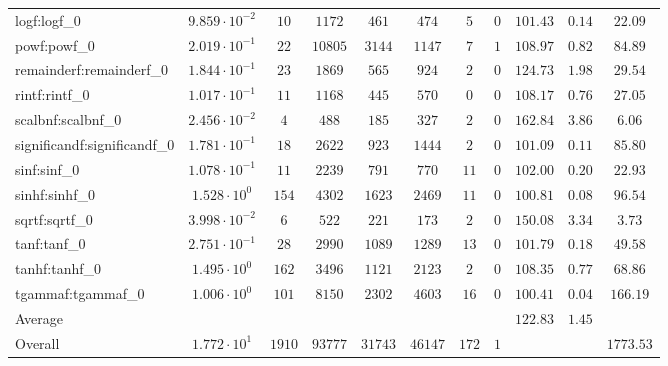 \begin{tabular}{|l|c|c|c|c|c|c|c|c|c|c|}
logf:logf\_0                 & $ 9.859 \cdot 10^{-2} $ & $ 10     $ & $ 1172  $ & $ 461   $ & $ 474   $ & $ 5   $ & $ 0 $ & $ 101.43      $ & $ 0.14    $ & $ 22.09   $ \\
powf:powf\_0                 & $ 2.019 \cdot 10^{-1} $ & $ 22     $ & $ 10805 $ & $ 3144  $ & $ 1147  $ & $ 7   $ & $ 1 $ & $ 108.97      $ & $ 0.82    $ & $ 84.89   $ \\
remainderf:remainderf\_0     & $ 1.844 \cdot 10^{-1} $ & $ 23     $ & $ 1869  $ & $ 565   $ & $ 924   $ & $ 2   $ & $ 0 $ & $ 124.73      $ & $ 1.98    $ & $ 29.54   $ \\
rintf:rintf\_0               & $ 1.017 \cdot 10^{-1} $ & $ 11     $ & $ 1168  $ & $ 445   $ & $ 570   $ & $ 0   $ & $ 0 $ & $ 108.17      $ & $ 0.76    $ & $ 27.05   $ \\
scalbnf:scalbnf\_0           & $ 2.456 \cdot 10^{-2} $ & $ 4      $ & $ 488   $ & $ 185   $ & $ 327   $ & $ 2   $ & $ 0 $ & $ 162.84      $ & $ 3.86    $ & $ 6.06    $ \\
significandf:significandf\_0 & $ 1.781 \cdot 10^{-1} $ & $ 18     $ & $ 2622  $ & $ 923   $ & $ 1444  $ & $ 2   $ & $ 0 $ & $ 101.09      $ & $ 0.11    $ & $ 85.80   $ \\
sinf:sinf\_0                 & $ 1.078 \cdot 10^{-1} $ & $ 11     $ & $ 2239  $ & $ 791   $ & $ 770   $ & $ 11  $ & $ 0 $ & $ 102.00      $ & $ 0.20    $ & $ 22.93   $ \\
sinhf:sinhf\_0               & $ 1.528 \cdot 10^{0}  $ & $ 154    $ & $ 4302  $ & $ 1623  $ & $ 2469  $ & $ 11  $ & $ 0 $ & $ 100.81      $ & $ 0.08    $ & $ 96.54   $ \\
sqrtf:sqrtf\_0               & $ 3.998 \cdot 10^{-2} $ & $ 6      $ & $ 522   $ & $ 221   $ & $ 173   $ & $ 2   $ & $ 0 $ & $ 150.08      $ & $ 3.34    $ & $ 3.73    $ \\
tanf:tanf\_0                 & $ 2.751 \cdot 10^{-1} $ & $ 28     $ & $ 2990  $ & $ 1089  $ & $ 1289  $ & $ 13  $ & $ 0 $ & $ 101.79      $ & $ 0.18    $ & $ 49.58   $ \\
tanhf:tanhf\_0               & $ 1.495 \cdot 10^{0}  $ & $ 162    $ & $ 3496  $ & $ 1121  $ & $ 2123  $ & $ 2   $ & $ 0 $ & $ 108.35      $ & $ 0.77    $ & $ 68.86   $ \\
tgammaf:tgammaf\_0           & $ 1.006 \cdot 10^{0}  $ & $ 101    $ & $ 8150  $ & $ 2302  $ & $ 4603  $ & $ 16  $ & $ 0 $ & $ 100.41      $ & $ 0.04    $ & $ 166.19  $ \\
\hline
Average                      & $                     $ & $        $ & $       $ & $       $ & $       $ & $     $ & $   $ & $ 122.83      $ & $ 1.45    $ & $         $ \\
\hline
Overall                      & $ 1.772 \cdot 10^{1}  $ & $ 1910   $ & $ 93777 $ & $ 31743 $ & $ 46147 $ & $ 172 $ & $ 1 $ & $             $ & $         $ & $ 1773.53 $ \\
\hline
\end{tabular}
